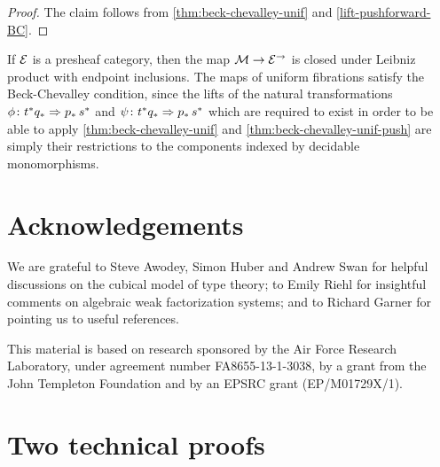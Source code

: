 \documentclass[reqno,10pt,a4paper,oneside,draft]{amsart}
\begin{document}
\begin{proof} The claim follows from \cref{thm:beck-chevalley-unif} and \cref{lift-pushforward-BC}.
\end{proof}


\begin{example} If $\catE$ is a presheaf category, 
then the map $\cal{M} \to \cal{E}^\to$ is closed under Leibniz product with endpoint inclusions. The maps of uniform
fibrations satisfy the Beck-Chevalley condition, since  the lifts
of the natural transformations
$\phi \co t^* q_* \Rightarrow p_* \, s^*$  and $\psi \co t^* q_* \Rightarrow p_* \, s^*$  
which are required to exist in order to be able to apply \cref{thm:beck-chevalley-unif} and \cref{thm:beck-chevalley-unif-push}
are simply their restrictions to the components indexed by decidable monomorphisms. 
\end{example}


\section*{Acknowledgements}

We are grateful to Steve Awodey, Simon Huber and Andrew Swan for helpful discussions on the cubical model of type theory; to Emily Riehl for insightful comments on algebraic weak factorization systems; and to Richard Garner for pointing us to useful references.

This material is based on research sponsored by the Air Force Research Laboratory, under agreement number FA8655-13-1-3038, by a grant from the John Templeton Foundation and by an EPSRC grant (EP/M01729X/1).


\appendix

\section{Two technical proofs}
\label{app:tecp}
\end{document}
